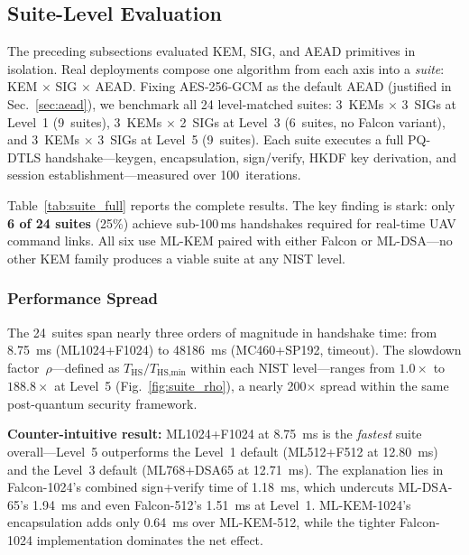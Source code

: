 

\subsection{Suite-Level Evaluation}
\label{sec:suite}

The preceding subsections evaluated KEM, SIG, and AEAD primitives in
isolation.  Real deployments compose one algorithm from each axis into a
\emph{suite}: KEM$\,\times\,$SIG$\,\times\,$AEAD.  Fixing AES-256-GCM
as the default AEAD (justified in Sec.~\ref{sec:aead}), we benchmark
all 24 level-matched suites: 3~KEMs $\times$ 3~SIGs at Level~1
(9~suites), 3~KEMs $\times$ 2~SIGs at Level~3 (6~suites, no
Falcon variant), and 3~KEMs $\times$ 3~SIGs at Level~5 (9~suites).
Each suite executes a full PQ-DTLS handshake---keygen, encapsulation,
sign/verify, HKDF key derivation, and session establishment---measured
over 100~iterations.

Table~\ref{tab:suite_full} reports the complete results.  The key
finding is stark: only \textbf{6 of 24 suites} (25\%) achieve
sub-100\,ms handshakes required for real-time UAV command links.
All six use ML-KEM paired with either Falcon or ML-DSA---no other
KEM family produces a viable suite at any NIST level.

\subsubsection{Performance Spread}
The 24~suites span nearly three orders of magnitude in handshake time:
from \SI{8.75}{ms} (ML1024+F1024) to \SI{48186}{ms}
(MC460+SP192, timeout).  The slowdown factor~$\rho$---defined as
$T_\text{HS}/T_\text{HS,min}$ within each NIST level---ranges from
$1.0\times$ to $188.8\times$ at Level~5
(Fig.~\ref{fig:suite_rho}), a nearly 200$\times$ spread within
the same post-quantum security framework.

\textbf{Counter-intuitive result:} ML1024+F1024 at \SI{8.75}{ms}
is the \emph{fastest} suite overall---Level~5 outperforms the Level~1
default (ML512+F512 at \SI{12.80}{ms}) and the Level~3 default
(ML768+DSA65 at \SI{12.71}{ms}).  The explanation lies in
Falcon-1024's combined sign+verify time of \SI{1.18}{ms}, which
undercuts ML-DSA-65's \SI{1.94}{ms} and even Falcon-512's
\SI{1.51}{ms} at Level~1.  ML-KEM-1024's encapsulation adds only
\SI{0.64}{ms} over ML-KEM-512, while the tighter Falcon-1024
implementation dominates the net effect.

